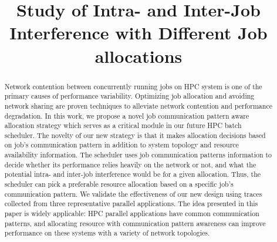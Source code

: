 \documentclass[conference]{IEEEtran}
\begin{document}
%
\title{Study of Intra- and Inter-Job Interference with Different Job allocations}
\author{



}

\maketitle


\begin{abstract} 

Network contention between concurrently running jobs on HPC system is one of the primary causes of performance variability. Optimizing job allocation and avoiding network sharing are proven techniques to alleviate network contention and performance degradation. In this work, we propose a novel job communication pattern aware allocation strategy which serves as a critical module in our future HPC batch scheduler. The novelty of our new strategy is that it makes allocation decisions based on job’s communication pattern in addition to system topology and resource availability information. The scheduler uses job communication patterns information to decide whether its performance relies heavily on the network or not, and what the potential intra- and inter-job interference would be for a given allocation. Thus, the scheduler can pick a preferable resource allocation based on a specific job's communication pattern. We validate the effectiveness of our new design using traces collected from three representative parallel applications. The idea presented in this paper is widely applicable: HPC parallel applications have common communication patterns, and allocating resource with communication pattern awareness can improve performance on these systems with a variety of network topologies.

\end{abstract}
\end{document}
